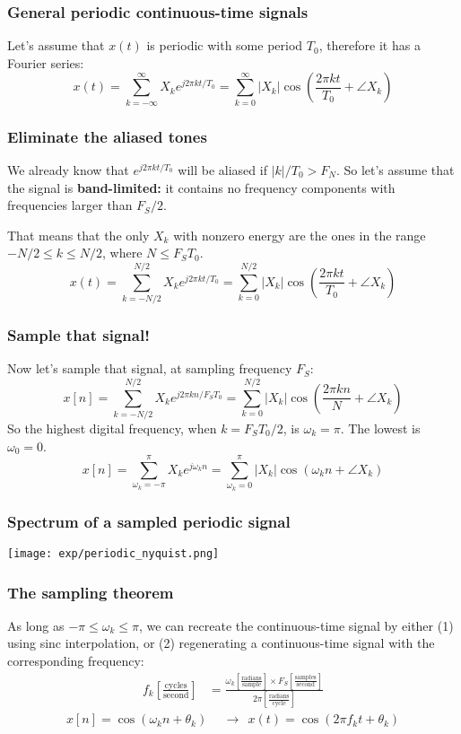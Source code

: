 \documentclass{beamer}
\begin{document}
\begin{frame}
  \frametitle{General periodic continuous-time signals}

  Let's assume that $x(t)$ is periodic with some period $T_0$,
  therefore it has a Fourier series:
  \[
  x(t) = \sum_{k=-\infty}^\infty X_k e^{j2\pi kt/T_0}
  = \sum_{k=0}^\infty |X_k|\cos\left(\frac{2\pi kt}{T_0}+\angle X_k\right)
  \]
\end{frame}

\begin{frame}
  \frametitle{Eliminate the aliased tones}

  We already know that $e^{j2\pi kt/T_0}$ will be aliased if $|k|/T_0 >
  F_N$.  So let's assume that the signal is {\bf band-limited:} it
  contains no frequency components with frequencies larger than $F_S/2$.

  That means that the only $X_k$ with nonzero energy are the ones in
  the range $-N/2\le k\le N/2$, where $N\le F_ST_0$.
  \[
  x(t) = \sum_{k=-N/2}^{N/2} X_k e^{j2\pi kt/T_0}
  = \sum_{k=0}^{N/2} |X_k|\cos\left(\frac{2\pi kt}{T_0}+\angle X_k\right)
  \]
\end{frame}

\begin{frame}
  \frametitle{Sample that signal!}

  Now let's sample that signal, at sampling frequency $F_S$:
  \[
  x[n] = \sum_{k=-N/2}^{N/2} X_k e^{j2\pi k n/F_ST_0}
  = \sum_{k=0}^{N/2} |X_k|\cos\left(\frac{2\pi kn}{N}+\angle X_k\right)
  \]
  So the highest digital frequency, when $k=F_ST_0/2$, is
  $\omega_k=\pi$.  The lowest is $\omega_0=0$.  
  \[
  x[n] = \sum_{\omega_k=-\pi}^{\pi} X_k e^{j\omega_k n}
  = \sum_{\omega_k=0}^{\pi} |X_k|\cos\left(\omega_k n+\angle X_k\right)
  \]
\end{frame}

\begin{frame}
  \frametitle{Spectrum of a sampled periodic signal}


  \centerline{\texttt{[image: exp/periodic\_nyquist.png]}}
\end{frame}

\begin{frame}
  \frametitle{The sampling theorem}

  As long as $-\pi\le\omega_k\le \pi$, we can recreate the
  continuous-time signal by either (1) using sinc interpolation, or
  (2) regenerating a continuous-time signal with the corresponding
  frequency:
  \begin{align*}
    f_k \left[\frac{\textrm{cycles}}{\textrm{second}}\right] &=
    \frac{\omega_k \left[\frac{\textrm{radians}}{\textrm{sample}}\right]\times F_S \left[\frac{\textrm{samples}}{\textrm{second}}\right]}{2\pi\left[\frac{\textrm{radians}}{\textrm{cycle}}\right]}
  \end{align*}
  \begin{align*}
    x[n] = \cos(\omega_k n+\theta_k)~~&\rightarrow~~
    x(t) = \cos(2\pi f_k t+\theta_k)
  \end{align*}
\end{frame}
\end{document}
